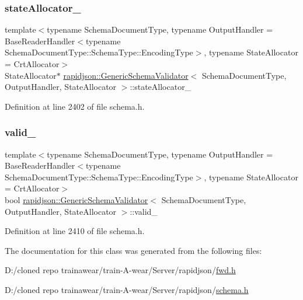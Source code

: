 \subsubsection{\texorpdfstring{stateAllocator\_}{stateAllocator\_}}
{\footnotesize\ttfamily template$<$typename Schema\+Document\+Type, typename Output\+Handler = Base\+Reader\+Handler$<$typename Schema\+Document\+Type\+::\+Schema\+Type\+::\+Encoding\+Type$>$, typename State\+Allocator = Crt\+Allocator$>$ \\
State\+Allocator$\ast$ \mbox{\hyperlink{classrapidjson_1_1_generic_schema_validator}{rapidjson\+::\+Generic\+Schema\+Validator}}$<$ Schema\+Document\+Type, Output\+Handler, State\+Allocator $>$\+::state\+Allocator\+\_\+\hspace{0.3cm}{\ttfamily [private]}}



Definition at line 2402 of file schema.\+h.

\mbox{\label{classrapidjson_1_1_generic_schema_validator_aa44db889fe75a923df60f6ec668eac92}} 
\subsubsection{\texorpdfstring{valid\_}{valid\_}}
{\footnotesize\ttfamily template$<$typename Schema\+Document\+Type, typename Output\+Handler = Base\+Reader\+Handler$<$typename Schema\+Document\+Type\+::\+Schema\+Type\+::\+Encoding\+Type$>$, typename State\+Allocator = Crt\+Allocator$>$ \\
bool \mbox{\hyperlink{classrapidjson_1_1_generic_schema_validator}{rapidjson\+::\+Generic\+Schema\+Validator}}$<$ Schema\+Document\+Type, Output\+Handler, State\+Allocator $>$\+::valid\+\_\+\hspace{0.3cm}{\ttfamily [private]}}



Definition at line 2410 of file schema.\+h.



The documentation for this class was generated from the following files\+:\begin{DoxyCompactItemize}
\item 
D\+:/cloned repo trainawear/train-\/\+A-\/wear/\+Server/rapidjson/\mbox{\hyperlink{fwd_8h}{fwd.\+h}}\item 
D\+:/cloned repo trainawear/train-\/\+A-\/wear/\+Server/rapidjson/\mbox{\hyperlink{schema_8h}{schema.\+h}}\end{DoxyCompactItemize}
